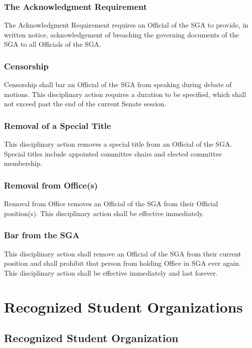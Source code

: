 \documentclass[12pt]{scrreprt}
\begin{document}
\subsection{The Acknowledgment Requirement}
The Acknowledgment Requirement requires an Official of the SGA to provide, in written notice,
acknowledgement of breaching the governing documents of the SGA to all Officials of the SGA.

\subsection{Censorship}
Censorship shall bar an Official of the SGA from speaking during debate of motions. This disciplinary
action requires a duration to be specified, which shall not exceed past the end of the current Senate
session.

\subsection{Removal of a Special Title}
This disciplinary action removes a special title from an Official of the SGA. Special titles include
appointed committee chairs and elected committee membership.

\subsection{Removal from Office(s)}
Removal from Office removes an Official of the SGA from their Official position(s). This disciplinary
action shall be effective immediately.

\subsection{Bar from the SGA}
This disciplinary action shall remove an Official of the SGA from their current position and shall prohibit
that person from holding Office in SGA ever again. This disciplinary action shall be effective
immediately and last forever.

\chapter{Recognized Student Organizations} \label{sec:rsos}

\section{Recognized Student Organization}
\end{document}
